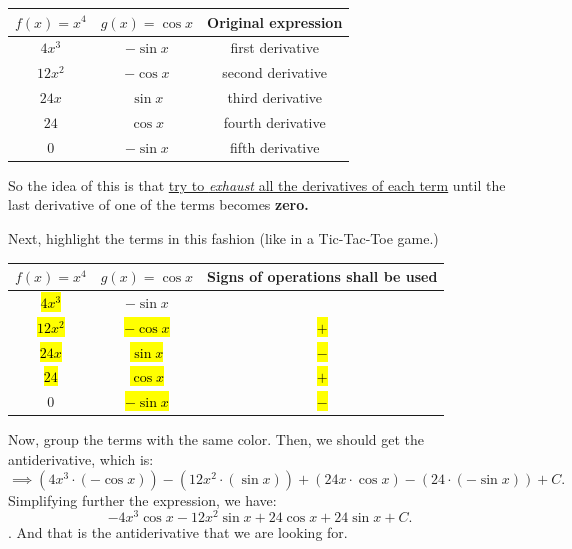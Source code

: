 \documentclass[11pt,paper=letter]{scrartcl}
\newcommand{\hlc}[2][yellow]{ {\sethlcolor{#1} \hl{#2}} }
\begin{document}
\begin{center}
    \begin{tabular}{c|c|c}
        $f(x) = x^4$ & $g(x) = \cos x$ & \textbf{Original expression}\\
            \hline
        $4x^3 $ & $-\sin x$ & first derivative \\
            \hline
        $12x^2$ & $-\cos x$ & second derivative \\    
            \hline
        $24x$ & $\sin x$ & third derivative \\   
            \hline
        $24$ & $\cos x$ & fourth derivative \\   
           \hline
        $0$ & $-\sin x$ & fifth derivative \\   
    \end{tabular}
\end{center}

So the idea of this is that \underline{try to \textit{exhaust} all the derivatives of each term} until the last derivative of one of the terms becomes \textbf{zero.}

\vspace{2mm}

Next, highlight the terms in this fashion (like in a Tic-Tac-Toe game.)

\begin{center}
    \begin{tabular}{c|c|c}
        $f(x) = x^4$ & $g(x) = \cos x$ & \textbf{Signs of operations shall be used}\\
            \hline
        \hlc[green]{$4x^3$} & $-\sin x$ & \\
            \hline
        \hlc[Apricot]{$12x^2$} &  \hlc[green]{$-\cos x$} &  \hlc[green]{$+$} \\    
            \hline
        \hlc[Purple]{$24x$} &  \hlc[Apricot]{$\sin x$} & \hlc[Apricot]{$-$} \\   
            \hline
        \hlc[YellowGreen]{$24$} & \hlc[Purple]{$\cos x$} & \hlc[Purple]{$+$} \\   
           \hline
        $0$ & \hlc[YellowGreen]{$-\sin x$} &  \hlc[YellowGreen]{$-$} \\   
    \end{tabular}
\end{center}

Now, group the terms with the same color. Then, we should get the antiderivative, which is: $$ \implies \left(4x^3 \cdot (-\cos x) \right) - \left(12x^2\cdot (\sin x)\right) + \left(24x \cdot \cos x\right) - \left(24 \cdot (-\sin x) \right) + C.$$ Simplifying further the expression, we have: $$-4x^3\cos x - 12x^2\sin x + 24\cos x + 24\sin x + C.$$. And that is the antiderivative that we are looking for.
\end{document}
